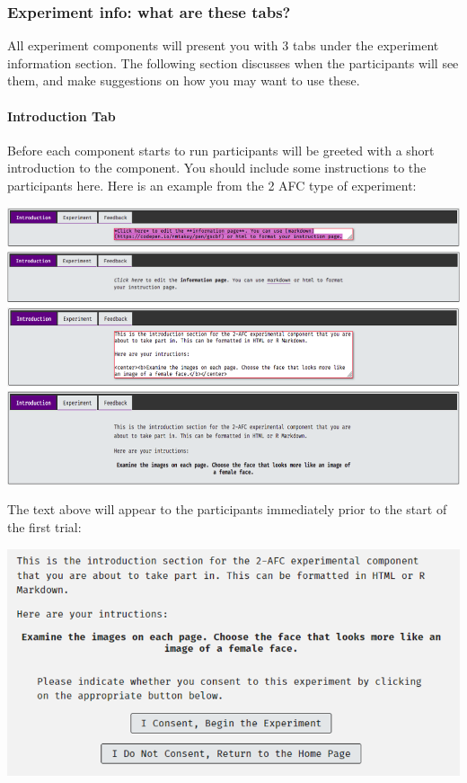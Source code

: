 \documentclass[]{book}
\let\oldparagraph\paragraph
\renewcommand{\paragraph}[1]{\oldparagraph{#1}\mbox{}}
\begin{document}
\subsubsection{Experiment info: what are these
tabs?}\label{experiment-info-what-are-these-tabs}

All experiment components will present you with 3 tabs under the
experiment information section. The following section discusses when the
participants will see them, and make suggestions on how you may want to
use these.

\paragraph{Introduction Tab}\label{introduction-tab}

Before each component starts to run participants will be greeted with a
short introduction to the component. You should include some
instructions to the participants here. Here is an example from the 2 AFC
type of experiment:

\includegraphics{images/screenshots/exp_7.png}

The text above will appear to the participants immediately prior to the
start of the first trial:

\includegraphics{images/screenshots/exp_8.png}
\end{document}
